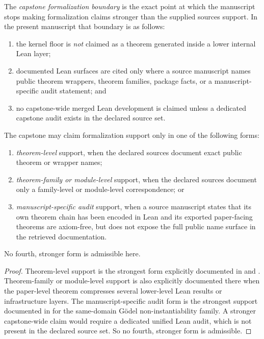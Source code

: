 \begin{definition}
The \emph{capstone formalization boundary} is the exact point at which the manuscript stops making formalization claims stronger than the supplied sources support. In the present manuscript that boundary is as follows:
\begin{enumerate}
  \item the kernel floor is \emph{not} claimed as a theorem generated inside a lower internal Lean layer;
  \item documented Lean surfaces are cited only where a source manuscript names public theorem wrappers, theorem families, package facts, or a manuscript-specific audit statement; and
  \item no capstone-wide merged Lean development is claimed unless a dedicated capstone audit exists in the declared source set.
\end{enumerate}
\end{definition}

\begin{theorem}
\label{thm:no-overclaim-formalization}
The capstone may claim formalization support only in one of the following forms:
\begin{enumerate}
  \item \emph{theorem-level} support, when the declared sources document exact public theorem or wrapper names;
  \item \emph{theorem-family or module-level} support, when the declared sources document only a family-level or module-level correspondence; or
  \item \emph{manuscript-specific audit} support, when a source manuscript states that its own theorem chain has been encoded in Lean and its exported paper-facing theorems are axiom-free, but does not expose the full public name surface in the retrieved documentation.
\end{enumerate}
No fourth, stronger form is admissible here.
\end{theorem}

\begin{proof}
Theorem-level support is the strongest form explicitly documented in \fcas{} and \trajpaper{}. Theorem-family or module-level support is also explicitly documented there when the paper-level theorem compresses several lower-level Lean results or infrastructure layers. The manuscript-specific audit form is the strongest support documented in \noninstgodeldoc{} for the same-domain G\"odel non-instantiability family. A stronger capstone-wide claim would require a dedicated unified Lean audit, which is not present in the declared source set. So no fourth, stronger form is admissible.
\end{proof}

